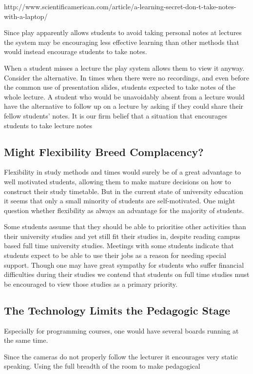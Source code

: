 \documentclass[a4paper,10pt]{article}
\begin{document}
http://www.scientificamerican.com/article/a-learning-secret-don-t-take-notes-with-a-laptop/

Since play apparently allows students to avoid taking personal notes at lectures the system may be encouraging less effective learning than other methods that would instead encourage students to take notes.


When a student misses a lecture the play system allows them to view it anyway. Consider the alternative. In times when there were no recordings, and even before the common use of presentation slides, students expected to take notes of the whole lecture. A student who would be unavoidably absent from a lecture would have the alternative to follow up on a lecture by asking if they could share their fellow students' notes. It is our firm belief that a situation that encourages students to take lecture notes

\subsection{Might Flexibility Breed Complacency?}
Flexibility in study methods and times would surely be of a great advantage to well motivated students, allowing them to make mature decisions on how to construct their study timetable. But in the current state of university education it seems that only a small minority of students are self-motivated. One might question whether flexibility as always an advantage for the majority of students.

Some students assume that they should be able to prioritise other activities than their university studies and yet still fit their studies in, despite reading campus based full time university studies. Meetings with some students indicate that students expect to be able to use their jobs as a reason for needing special support. Though one may have great sympathy for students who suffer financial difficulties during their studies we contend that students on full time studies must be encouraged to view those studies as a primary priority.

\subsection{The Technology Limits the Pedagogic Stage}
Especially for programming courses, one would have several boards running at the same time.

Since the cameras do not properly follow the lecturer it encourages very static speaking. Using the full breadth of the room to make pedagogical 
\end{document}
